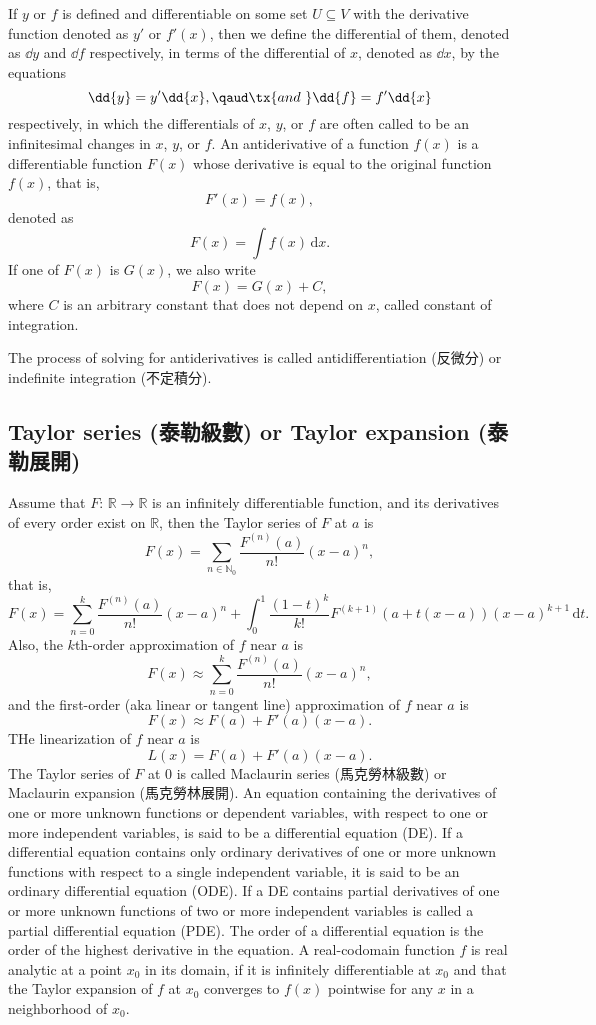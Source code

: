 \documentclass[a4paper,12pt]{report}
\begin{document}
\begin{itemize}
\begin{itemize}
If $y$ or $f$ is defined and differentiable on some set $U\subseteq V$ with the derivative function denoted as $y'$ or $f'(x)$, then we define the differential of them, denoted as $\dd{y}$ and $\dd{f}$ respectively, in terms of the differential of $x$, denoted as $\dd{x}$, by the equations
\[\dd{y}=y'\dd{x},\qaud \tx{and\ }\dd{f}=f'\dd{x}\]
respectively, in which the differentials of $x$, $y$, or $f$ are often called to be an infinitesimal changes in $x$, $y$, or $f$.
An antiderivative of a function $f(x)$ is a differentiable function $F(x)$ whose derivative is equal to the original function $f(x)$, that is,
\[F'(x)=f(x),\]
denoted as
\[F(x)=\int f(x)\,\mathrm{d}x.\]
If one of $F(x)$ is $G(x)$, we also write
\[F(x)=G(x)+C,\]
where $C$ is an arbitrary constant that does not depend on $x$, called constant of integration.

The process of solving for antiderivatives is called antidifferentiation (反微分) or indefinite integration (不定積分).
\subsection{Taylor series (泰勒級數) or Taylor expansion (泰勒展開)}
Assume that $F:\,\mathbb{R}\to\mathbb{R}$ is an infinitely differentiable function, and its derivatives of every order exist on $\mathbb{R}$, then the Taylor series of $F$ at $a$ is
\[F(x) = \sum_{n\in\mathbb{N}_0} \frac{F^{(n)}(a)}{n!}(x-a)^n,\]
that is,
\[F(x) = \sum^k_{n=0} \frac{F^{(n)}(a)}{n!}(x-a)^n+\int_0^1\frac{(1-t)^k}{k!}F^{(k+1)}(a+t(x-a))(x-a)^{k+1}\,\mathrm{d}t.\]
Also, the $k$th-order approximation of $f$ near $a$ is
\[F(x) \approx \sum^k_{n=0} \frac{F^{(n)}(a)}{n!}(x-a)^n,\]
and the first-order (aka linear or tangent line) approximation of $f$ near $a$ is
\[F(x) \approx F(a)+F'(a)(x-a).\]
THe linearization of $f$ near $a$ is
\[L(x)=F(a)+F'(a)(x-a).\]
The Taylor series of $F$ at $0$ is called Maclaurin series (馬克勞林級數) or Maclaurin expansion (馬克勞林展開).
An equation containing the derivatives of one or more unknown functions or dependent variables, with respect to one or more independent variables, is said to be a differential equation (DE).
If a differential equation contains only ordinary derivatives of one or more unknown functions with respect to a single independent variable, it is said to be an ordinary differential equation (ODE).
If a DE contains partial derivatives of one or more unknown functions of two or more independent variables is called a partial differential equation (PDE).
The order of a differential equation is the order of the highest derivative in the equation.
A real-codomain function $f$ is real analytic at a point $x_0$ in its domain, if it is infinitely differentiable at $x_0$ and that the Taylor expansion of $f$ at $x_0$ converges to $f(x)$ pointwise for any $x$ in a neighborhood of $x_0$.


\end{itemize}
\end{itemize}
\end{document}

